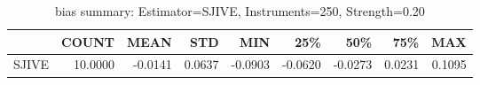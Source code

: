 \begin{table}[ht]
\centering
\caption{bias summary: Estimator=SJIVE, Instruments=250, Strength=0.20}
\begin{tabular}{lrrrrrrrr}
\toprule
 & COUNT & MEAN & STD & MIN & 25\% & 50\% & 75\% & MAX \\
\midrule
SJIVE & 10.0000 & -0.0141 & 0.0637 & -0.0903 & -0.0620 & -0.0273 & 0.0231 & 0.1095 \\
\bottomrule
\end{tabular}
\end{table}
